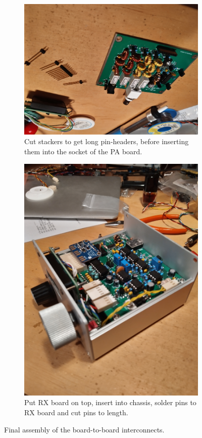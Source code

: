 \documentclass[10pt, a4paper,twoside]{scrartcl}
\begin{document}
\begin{figure}[!ht]
 \centering
 \begin{subfigure}{0.49\linewidth} 
  \includegraphics[width=\linewidth]{fig/stackers_small.png}
  \caption{Cut stackers to get long pin-headers, before inserting them into the socket of the PA board.} \label{fig:stackers}
 \end{subfigure} 
 \begin{subfigure}{0.49\linewidth} 
  \includegraphics[width=\linewidth]{fig/final_small.png}
  \caption{Put RX board on top, insert into chassis, solder pins to RX board and cut pins to length.} \label{fig:final}
 \end{subfigure}
 \caption{Final assembly of the board-to-board interconnects.}
\end{figure}
\end{document}
